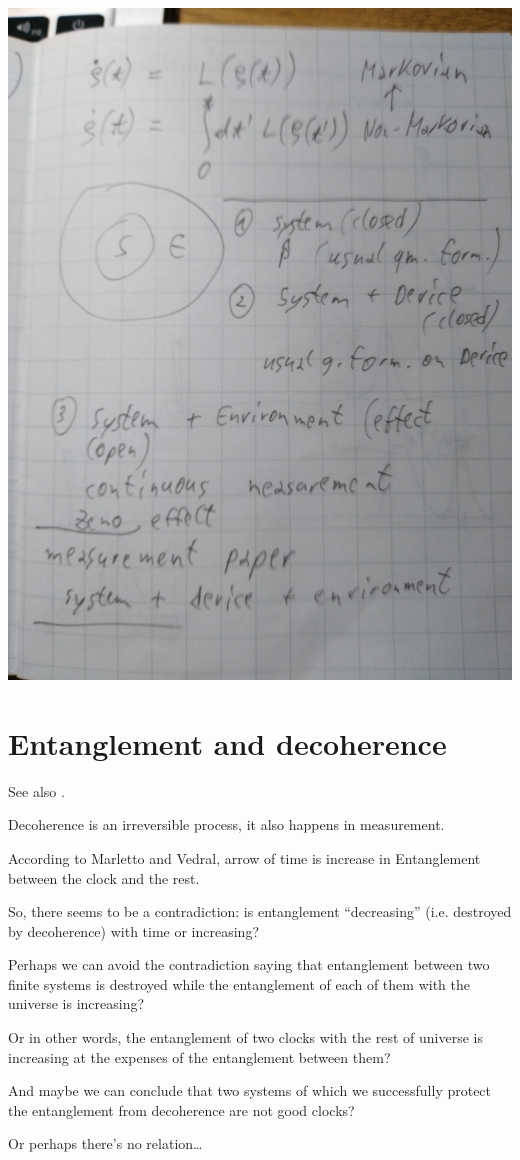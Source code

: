 \clearpage\includegraphics[width=\linewidth]{img/pw/qmem/nonmarkov.jpg}

\section{Entanglement and decoherence}
See also \cite{EntanglementVsDecoherence}.

Decoherence is an irreversible process, it also happens in measurement.

According to Marletto and Vedral, arrow of time is increase in Entanglement
between the clock and the rest.

So, there seems to be a contradiction: is entanglement ``decreasing''
(i.e. destroyed by decoherence) with time
or increasing?

Perhaps we can avoid the contradiction saying that
entanglement between two finite systems is
destroyed while the entanglement of each of them with the universe
is increasing?

Or in other words, the entanglement of two clocks with the rest of universe
is increasing at the expenses of the entanglement between them?

And maybe we can conclude that two systems  of which we successfully
protect the entanglement from decoherence are not good clocks?

Or perhaps there's no relation\dots